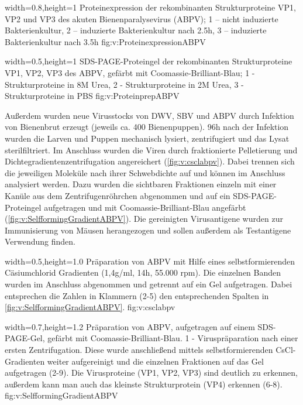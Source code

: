 {width=0.8\textwidth,height=1\textheight}
{Proteinexpression der rekombinanten Strukturproteine VP1, VP2 und VP3 des akuten Bienenparalysevirus (ABPV); 1 – nicht induzierte Bakterienkultur, 2 – induzierte Bakterienkultur nach 2.5h, 3 – induzierte Bakterienkultur nach 3.5h
}%
{}%
{fig:v:ProteinexpressionABPV}%

{width=0.5\textwidth,height=1\textheight}
{SDS-PAGE-Proteingel der rekombinanten Strukturproteine VP1, VP2, VP3 des ABPV, gefärbt mit Coomassie-Brilliant-Blau; 1 - Strukturproteine in 8M Urea, 2 - Strukturproteine in 2M Urea, 3 - Strukturproteine in PBS
}%
{}%
{fig:v:ProteinprepABPV}%

Außerdem wurden neue Virusstocks von DWV, SBV und ABPV durch Infektion von Bienenbrut erzeugt (jeweils ca. 400 Bienenpuppen). 96h nach der Infektion wurden die Larven und Puppen mechanisch lysiert, zentrifugiert und das Lysat sterilfiltriert. Im Anschluss wurden die Viren durch fraktionierte Pelletierung und Dichtegradientenzentrifugation angereichert (\cref{fig:v:csclabpv}). Dabei trennen sich die jeweiligen Moleküle nach ihrer Schwebdichte auf und können im Anschluss analysiert werden. Dazu wurden die sichtbaren Fraktionen einzeln mit einer Kanüle aus dem Zentrifugenröhrchen abgenommen und auf ein SDS-PAGE-Proteingel aufgetragen und mit Coomassie-Brilliant-Blau angefärbt (\cref{fig:v:SelfformingGradientABPV}).
Die gereinigten Virusantigene wurden zur Immunisierung von Mäusen herangezogen und sollen außerdem als Testantigene Verwendung finden.

{width=0.5\textwidth,height=1.0\textheight}
{Präparation von ABPV mit Hilfe eines selbstformierenden Cäsiumchlorid Gradienten (1,4g/ml, 14h, 55.000 rpm). Die einzelnen Banden wurden im Anschluss abgenommen und getrennt auf ein Gel aufgetragen. Dabei entsprechen die Zahlen in Klammern (2-5) den entsprechenden Spalten in \cref{fig:v:SelfformingGradientABPV}.}%
{}%
{fig:v:csclabpv}%

{width=0.7\textwidth,height=1.2\textheight}
{Präparation von ABPV, aufgetragen auf einem SDS-PAGE-Gel, gefärbt mit Coomassie-Brilliant-Blau. 
1 - Viruspräparation nach einer ersten Zentrifugation. Diese wurde anschließend mittels selbstformierenden CsCl-Gradienten weiter aufgereinigt und die einzelnen Fraktionen auf das Gel aufgetragen (2-9). Die Virusproteine (VP1, VP2, VP3) sind deutlich zu erkennen, außerdem kann man auch das kleinste Strukturprotein (VP4) erkennen (6-8). }%
{}%
{fig:v:SelfformingGradientABPV}%

